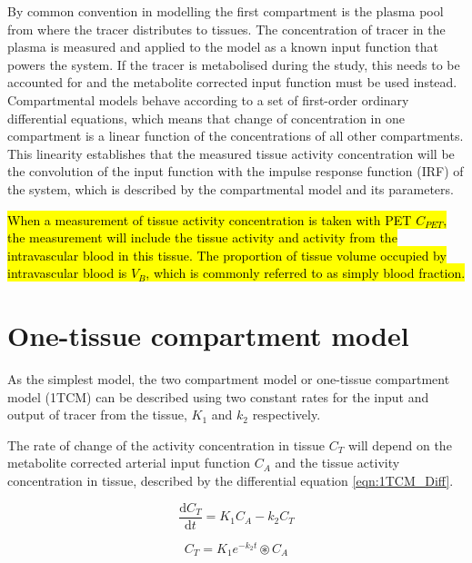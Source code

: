 By common convention in modelling the first compartment is the plasma pool from where the tracer distributes to tissues. The concentration of tracer in the plasma is measured and applied to the model as a known input function that powers the system. If the tracer is metabolised during the study, this needs to be accounted for and the metabolite corrected input function must be used instead. Compartmental models behave according to a set of first-order ordinary differential equations, which means that change of concentration in one compartment is a linear function of the concentrations of all other compartments. This linearity establishes that the measured tissue activity concentration will be the convolution of the input function with the impulse response function (IRF) of the system, which is described by the compartmental model and its parameters. \par
\hl{When a measurement of tissue activity concentration is taken with PET $C_{PET}$, the measurement will include the tissue activity and activity from the intravascular blood in this tissue. The proportion of tissue volume occupied by intravascular blood is $V_B$, which is commonly referred to as simply blood fraction.}\par

\section{One-tissue compartment model}
As the simplest model, the two compartment model or one-tissue compartment model (1TCM) can be described using two constant rates for the input and output of tracer from the tissue, $K_1$ and $k_2$ respectively.


The rate of change of the activity concentration in tissue $C_T$ will depend on the metabolite corrected arterial input function $C_A$ and the tissue activity concentration in tissue, described by the differential equation \ref{eqn:1TCM_Diff}.

\begin{equation}
  \frac{\mathrm d C_T}{\mathrm d t} = K_1 C_A - k_2 C_T
  \label{eqn:1TCM_Diff}
\end{equation}

\begin{equation}
   C_T = K_1 e^{-k_2 t} \circledast C_A 
  \label{eqn:1TCM}
\end{equation}

